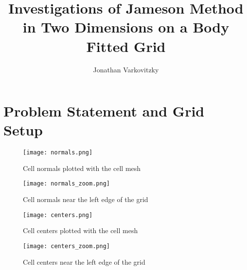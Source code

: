 \documentclass[a4paper,12pt,titlepage]{article}
\newcommand{\scale}{0.5}
\begin{document}
\title{Investigations of Jameson Method in Two Dimensions on a Body Fitted Grid}
\author{Jonathan Varkovitzky}
\maketitle


\pagestyle{plain} %
\tableofcontents

\newpage

\setcounter{page}{2}


\newpage

\section{Problem Statement and Grid Setup}

\begin{figure}[H]
  \begin{center}
    \texttt{[image: normals.png]}
    \caption{Cell normals plotted with the cell mesh}
  \end{center}
\end{figure}

\begin{figure}[H]
  \begin{center}
    \texttt{[image: normals\_zoom.png]}
    \caption{Cell normals near the left edge of the grid}
  \end{center}
\end{figure}


\begin{figure}[H]
  \begin{center}
    \texttt{[image: centers.png]}
    \caption{Cell centers plotted with the cell mesh}
  \end{center}
\end{figure}

\begin{figure}[H]
  \begin{center}
    \texttt{[image: centers\_zoom.png]}
    \caption{Cell centers near the left edge of the grid}
  \end{center}
\end{figure}
\end{document}
